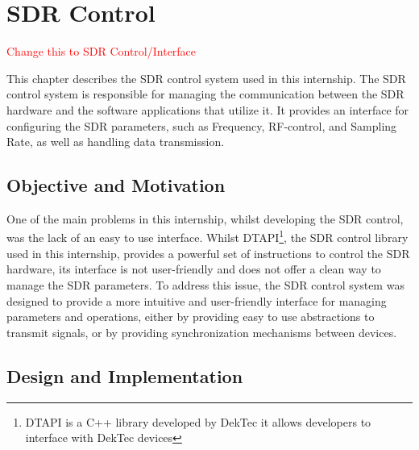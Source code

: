 
%

\chapter{SDR Control}
\label{cha:sdr-control}

\textcolor{Red}{Change this to SDR Control/Interface}

This chapter describes the \gls{SDR} control system used in this internship.
The \gls{SDR} control system is responsible for managing the communication
between the \gls{SDR} hardware and the software applications that utilize it.
It provides an interface for configuring the \gls{SDR} parameters, such as
Frequency, \gls{RF}-control, and Sampling Rate, as well as handling data
transmission.

\section{Objective and Motivation}

One of the main problems in this internship, whilst developing the \gls{SDR}
control, was the lack of an easy to use interface. Whilst
\gls{DTAPI}\footnote{\gls{DTAPI} is a C++ library developed by DekTec it allows
  developers to interface with DekTec devices}, the \gls{SDR} control library
used in this internship, provides a powerful set of instructions to control the
\gls{SDR} hardware, its interface is not user-friendly and does not offer a
clean way to manage the \gls{SDR} parameters. To address this issue, the
\gls{SDR} control system was designed to provide a more intuitive and
user-friendly interface for managing parameters and operations, either by
providing easy to use abstractions to transmit signals, or by providing
synchronization mechanisms between devices.

\section{Design and Implementation}

